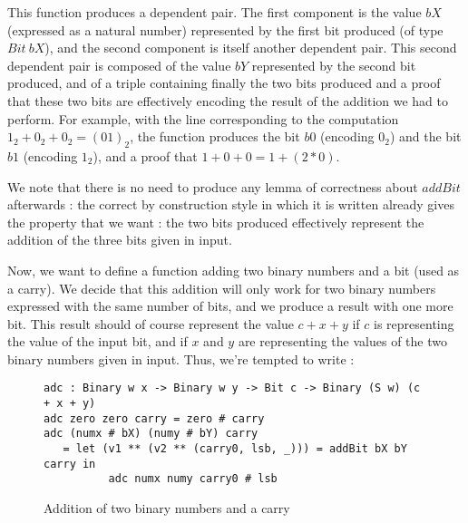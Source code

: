 This function produces a dependent pair. The first component is the value $bX$ (expressed as a natural number) represented by the first bit produced (of type $Bit\ bX$), and the second component is itself another dependent pair. This second dependent pair is composed of the value $bY$ represented by the second bit produced, and of a triple containing finally the two bits produced and a proof that these two bits are effectively encoding the result of the addition we had to perform.
For example, with the line corresponding to the computation $1_2 + 0_2 + 0_2 = (01)_2$, the function produces the bit $b0$ (encoding $0_2$) and the bit $b1$ (encoding $1_2$), and a proof that $1 + 0 + 0 = 1 + (2*0)$.

We note that there is no need to produce any lemma of correctness about $addBit$ afterwards : the correct by construction style in which it is written already gives the property that we want : the two bits produced effectively represent the addition of the three bits given in input.

Now, we want to define a function adding two binary numbers and a bit (used as a carry). We decide that this addition will only work for two binary numbers expressed with the same number of bits, and we produce a result with one more bit. This result should of course represent the value $c + x + y$ if $c$ is representing the value of the input bit, and if $x$ and $y$ are representing the values of the two binary numbers given in input. Thus, we're tempted to write :
\begin{figure}[H]
\figrule
\begin{center}
\begin{lstlisting}
adc : Binary w x -> Binary w y -> Bit c -> Binary (S w) (c + x + y)
adc zero zero carry = zero # carry
adc (numx # bX) (numy # bY) carry
   = let (v1 ** (v2 ** (carry0, lsb, _))) = addBit bX bY carry in
          adc numx numy carry0 # lsb
\end{lstlisting}
\end{center}
\caption{Addition of two binary numbers and a carry}
\figrule
\end{figure}

